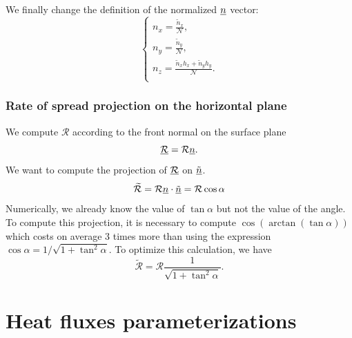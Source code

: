 We finally change the definition of the normalized $\underline{n}$ vector:
\begin{equation}
  \begin{cases}
  	n_x = \frac{\tilde n_x}{\mathcal N}, \\
  	n_y = \frac{\tilde n_y}{\mathcal N}, \\
  	n_z = \frac{\tilde n_x h_x + \tilde n_y h_y}{\mathcal N}. \\
  \end{cases}
\end{equation}

\subsubsection{Rate of spread projection on the horizontal plane}

We compute $\mathcal R$ according to the front normal on the surface plane
\begin{equation}
  \underline{\mathcal R} = \mathcal R \underline{n}.
\end{equation}
We want to compute the projection of $\underline{\mathcal R}$ on $\underline{\tilde n}$.
\begin{equation}
  \widetilde{\mathcal R} = \mathcal R \underline{n} \cdot \underline{\tilde n} = \mathcal R \cos \alpha
\end{equation}
Numerically, we already know the value of $\tan \alpha$ but not the value of the angle. To compute this projection, it is necessary to compute $\cos (\arctan (\tan \alpha))$ which costs on average 3 times more than using the expression $\cos \alpha = 1 /\sqrt{1 + \tan^2 \alpha}$.
To optimize this calculation, we have
\begin{equation}
  \widetilde{\mathcal R} = \mathcal R \frac{1}{\sqrt{1 + \tan^2 \alpha}}.
\end{equation}

\section{Heat fluxes parameterizations}

